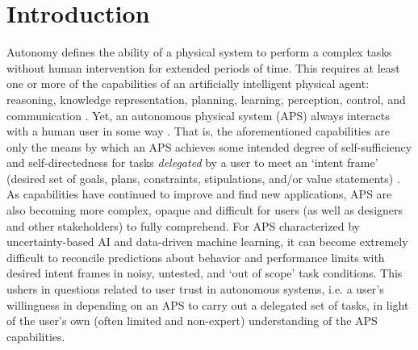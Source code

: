 \section{Introduction}
Autonomy defines the ability of a physical system to perform a complex tasks without human intervention for extended periods of time. This requires at least one or more of the capabilities of an artificially intelligent physical agent: reasoning, knowledge representation, planning, learning, perception, control, and communication \cite{Israelsen2017-ym}. 
Yet, an autonomous physical system (APS) always interacts with a human user in some way \cite{Bradshaw2013-ck}.  That is, the aforementioned capabilities are only the means by which an APS achieves some intended degree of self-sufficiency and self-directedness for tasks \emph{delegated} by a user to meet an `intent frame' (desired set of goals, plans, constraints, stipulations, and/or value statements) \cite{Miller2014-av}. 
As capabilities have continued to improve and find new applications, APS are also becoming more complex, opaque and difficult for users (as well as designers and other stakeholders) to fully comprehend. For APS characterized by uncertainty-based AI and data-driven machine learning, it can become extremely difficult to reconcile predictions about behavior and performance limits with desired intent frames in noisy, untested, and `out of scope' task conditions. This ushers in questions related to user trust in autonomous systems, i.e. a user's willingness in depending on an APS to carry out a delegated set of tasks, in light of the user's own (often limited and non-expert) understanding of the APS capabilities. 

